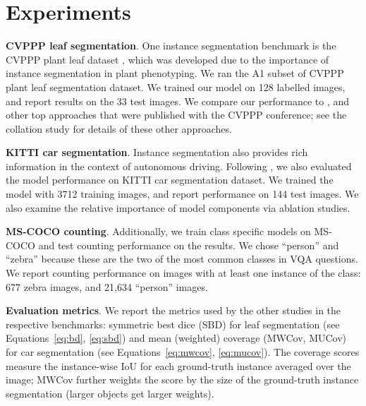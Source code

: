 \section{Experiments}

\textbf{CVPPP leaf segmentation}. One instance segmentation benchmark is the
CVPPP plant leaf dataset \cite{minervini14cvppp}, which was developed due to
the importance of instance segmentation in plant phenotyping. We ran the A1
subset of CVPPP plant leaf segmentation dataset. We trained our model on 128
labelled images, and report results on the 33 test images. We compare our
performance to \cite{romeraparedes15ris}, and other top approaches that were
published with the CVPPP conference; see the collation study
\cite{scharr16leaf} for details of these  other approaches.

\textbf{KITTI car segmentation}. Instance segmentation also provides rich
information in the context of autonomous driving. Following
\cite{zhang15insseg, zhang16insseg, uhrig16insseg}, we also evaluated the model
performance on KITTI car segmentation dataset. We trained the model with 3712
training images, and report performance on 144 test images. We also examine the
relative importance of model components via ablation studies.

\textbf{MS-COCO counting}. Additionally, we train class specific models on
MS-COCO and test counting performance on the results. We chose ``person'' and
``zebra'' because these are the two of the most common classes in VQA
questions. We report counting performance on images with at least one instance
of the class: 677 zebra images, and 21,634 ``person'' images.







\textbf{Evaluation metrics}. We report the  metrics used by the other studies
in the respective benchmarks: symmetric best dice (SBD) for leaf segmentation
(see Equations~\ref{eq:bd}, \ref{eq:sbd}) and mean (weighted) coverage (MWCov,
MUCov) for car segmentation (see Equations~\ref{eq:mwcov}, \ref{eq:mucov}). The
coverage scores measure the instance-wise IoU for each ground-truth instance
averaged over the image; MWCov further weights the score by the size of the
ground-truth instance segmentation (larger objects get larger weights).

